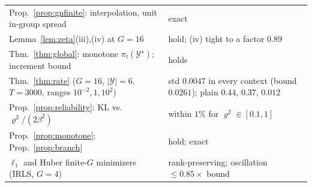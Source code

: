 \documentclass[11pt]{article}
\theoremstyle{definition}
\theoremstyle{remark}
\newcommand{\cY}{\mathcal{Y}}
\newcommand{\1}{\mathbb{1}}
\begin{document}
\begin{center}
\begin{tabularx}{\textwidth}{@{}>{\raggedright\arraybackslash}X>{\raggedright\arraybackslash}p{6.2cm}@{}}
Prop.~\ref{prop:gnfinite}: interpolation, unit in-group spread & exact\\
Lemma~\ref{lem:zeta}(iii),(iv) at $G=16$ & hold; (iv) tight to a factor $0.89$\\
Thm.~\ref{thm:global}: monotone $\pi_t(\cY^\star)$; increment bound & holds\\
Thm.~\ref{thm:rate} ($G=16$, $|\cY|=6$, $T=3000$, ranges $10^{-2},1,10^2$) & std $0.0047$ in every context (bound $0.0261$); plain $0.44$, $0.37$, $0.012$\\
Prop.~\ref{prop:reliability}: KL vs.\ $\varrho^2/(2\beta^2)$ & within $1\%$ for $\varrho^2\in[0.1,1]$\\
Prop.~\ref{prop:monotone}; Prop.~\ref{prop:branch} & hold; exact\\
$\ell_1$ and Huber finite-$G$ minimizers (IRLS, $G=4$) & rank-preserving; oscillation $\le0.85\times$ bound\\
\bottomrule
\end{tabularx}
\end{center}
\end{document}
